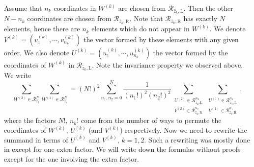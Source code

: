 \documentclass{article}
\numberwithin{equation}{section}
\newcommand{\LL}{\mathrm{L}}
\newcommand{\RR}{\mathrm{R}}
\begin{document}
Assume that $n_k$ coordinates in $W^{(k)}$ are chosen from $\mathcal{R}_{\hat z_k,\LL}$. Then the other $N-n_k$ coordinates are chosen from $\mathcal{R}_{\hat z_k,\RR}$. Note that $\mathcal{R}_{\hat z_k,\RR}$ has exactly $N$ elements, hence there are $n_k$ elements which do not appear in $W^{(k)}$. We denote $V^{(k)}=(v_1^{(k)},\cdots,v_{n_k}^{(k)})$ the vector formed by these elements with any given order. We also denote $U^{(k)}=(u_1^{(k)},\cdots,u_{n_k}^{(k)})$ the vector formed by the coordinates of $W^{(k)}$ in $\mathcal{R}_{\hat z_k,\LL}$. Note the invariance property we observed above. We write
\begin{equation}
	\label{eq:sum_rewriting}
	\sum_{W^{(2)} \in \mathcal{R}_{\hat z_2}^N}
	\sum_{W^{(1)} \in \mathcal{R}_{\hat z_1}^N} =(N!)^2\sum_{n_1,n_2=0}^N \frac{1}{(n_1!)^2(n_2!)^2}\sum_{\substack{U^{(2)} \in \mathcal{R}_{\hat z_2,\LL}^{n_2}\\ V^{(2)} \in \mathcal{R}_{\hat z_2,\RR}^{n_2}}}\sum_{\substack{U^{(1)} \in \mathcal{R}_{\hat z_1,\LL}^{n_1}\\ V^{(1)} \in \mathcal{R}_{\hat z_1,\RR}^{n_1}}},
\end{equation}
where the factors $N!$, $n_k!$ come from the number of ways to permute the coordinates of $W^{(k)}$, $U^{(k)}$ (and $V^{(k)}$) respectively. Now we need to rewrite the summand in terms of $U^{(k)}$ and $V^{(k)}$, $k=1,2$. Such a rewriting was mostly done in \cite{Baik-Liu16,Baik-Liu17} except for one extra factor. We will write down the formulas without proofs except for the one involving the extra factor.
\end{document}
